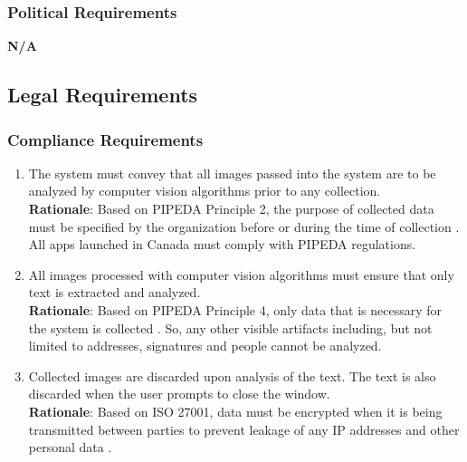 \subsubsection{Political Requirements}
\label{ssub:political_requirements}
\textbf{N/A}


\subsection{Legal Requirements}
\label{sub:legal_requirements}

\subsubsection{Compliance Requirements}
\label{ssub:compliance_requirements}
\begin{enumerate}[{LR-COMP}1. ]
	\item The system must convey that all images passed into the system are to be analyzed by computer vision algorithms prior to any collection.
	\\ \textbf{Rationale}: Based on PIPEDA Principle 2, the purpose of collected data must be specified by the organization before or during the time of collection \cite{11}. All apps launched in Canada must comply with PIPEDA regulations.
	\item All images processed with computer vision algorithms must ensure that only text is extracted and analyzed.
	\\ \textbf{Rationale}: Based on PIPEDA Principle 4, only data that is necessary for the system is collected \cite{11}. So, any other visible artifacts including, but not limited to addresses, signatures and people cannot be analyzed.
	\item Collected images are discarded upon analysis of the text. The text is also discarded when the user prompts to close the window.
	\\ \textbf{Rationale}: Based on ISO 27001, data must be encrypted when it is being transmitted between parties to prevent leakage of any IP addresses and other personal data \cite{8}.
\end{enumerate}


